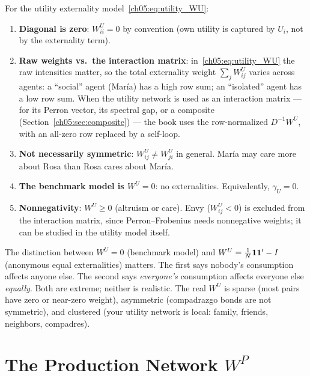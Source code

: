 \documentclass[../structural_economics_book.tex]{subfiles}
\begin{document}
\begin{remark}\label{ch05:prop:WU_properties}
For the utility externality model~\eqref{ch05:eq:utility_WU}:
\begin{enumerate}
\item \textbf{Diagonal is zero}: $W^U_{ii} = 0$ by convention (own utility is captured by $U_i$, not by the externality term).
\item \textbf{Raw weights vs.\ the interaction matrix}: in~\eqref{ch05:eq:utility_WU} the raw intensities matter, so the total externality weight $\sum_j W^U_{ij}$ varies across agents: a ``social'' agent (Mar\'{i}a) has a high row sum; an ``isolated'' agent has a low row sum. When the utility network is used as an interaction matrix --- for its Perron vector, its spectral gap, or a composite (Section~\ref{ch05:sec:composite}) --- the book uses the row-normalized $D^{-1}W^U$, with an all-zero row replaced by a self-loop.
\item \textbf{Not necessarily symmetric}: $W^U_{ij} \neq W^U_{ji}$ in general. Mar\'{i}a may care more about Rosa than Rosa cares about Mar\'{i}a.
\item \textbf{The benchmark model is $W^U = 0$}: no externalities. Equivalently, $\gamma_U = 0$.
\item \textbf{Nonnegativity}: $W^U \geq 0$ (altruism or care). Envy ($W^U_{ij} < 0$) is excluded from the interaction matrix, since Perron--Frobenius needs nonnegative weights; it can be studied in the utility model itself.
\end{enumerate}
\end{remark}

\begin{keyinsight}
The distinction between $W^U = 0$ (benchmark model) and $W^U = \frac{1}{N}\mathbf{1}\mathbf{1}' - I$ (anonymous equal externalities) matters. The first says nobody's consumption affects anyone else. The second says \textit{everyone's} consumption affects everyone else \textit{equally}. Both are extreme; neither is realistic. The real $W^U$ is sparse (most pairs have zero or near-zero weight), asymmetric (compadrazgo bonds are not symmetric), and clustered (your utility network is local: family, friends, neighbors, compadres).
\end{keyinsight}


\section{The Production Network $W^P$}
\label{ch05:sec:WP}
\end{document}
